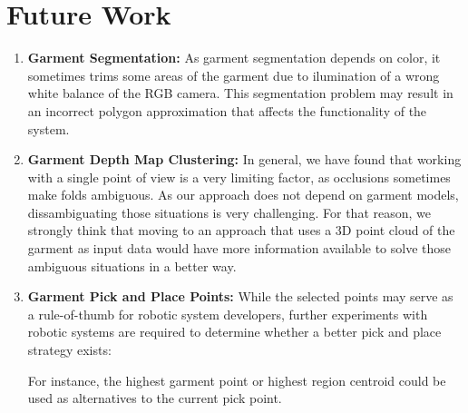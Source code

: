 \section{Future Work}
\label{conclusions:future_work}

\begin{enumerate}
	\item \textbf{Garment Segmentation:} As garment segmentation depends on color, it sometimes trims some areas of the garment due to ilumination of a wrong white balance of the RGB camera. This segmentation problem may result in an incorrect polygon approximation that affects the functionality of the system.
	\item \textbf{Garment Depth Map Clustering:} In general, we have found that working with a single point of view is a very limiting factor, as occlusions sometimes make folds ambiguous. As our approach does not depend on garment models, dissambiguating those situations is very challenging. For that reason, we strongly think that moving to an approach that uses a 3D point cloud of the garment as input data would have more information available to solve those ambiguous situations in a better way.

	\item \textbf{Garment Pick and Place Points:} While the selected points may serve as a rule-of-thumb for robotic system developers, further experiments with robotic systems are required to determine whether a better pick and place strategy exists:
	
	For instance, the highest garment point or highest region centroid could be used as alternatives to the current pick point.



	
\end{enumerate}


